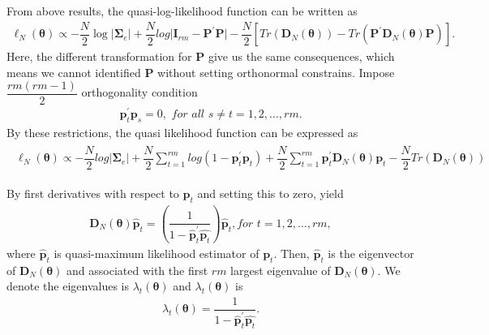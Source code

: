 \documentclass[12pt,a4paper,hyperref]{article}
\begin{document}
From above results, the quasi-log-likelihood function can be written as
\begin{align}
\ell_{N} ( \boldsymbol{\theta}) \propto-\dfrac{N}{2}\log \vert\boldsymbol{\Sigma}_{e} \vert + \dfrac{N}{2} log \vert \boldsymbol{I}_{rm}-\boldsymbol{P}^{'}\boldsymbol{P}\vert-\dfrac{N}{2}\left[Tr\left( \boldsymbol{D}_{N}(\boldsymbol{\theta}) \right)-Tr \left( \boldsymbol{P}^{'}\boldsymbol{D}_{N}(\boldsymbol{\theta})\boldsymbol{P} \right)  \right].
\end{align}
Here, the different transformation for $\boldsymbol{P}$ give us the same consequences, which means we cannot identified $\boldsymbol{P}$ without setting orthonormal constrains.
Impose $\dfrac{rm\left(rm-1\right)}{2}$ orthogonality condition
\begin{align}
\boldsymbol{p}_{t}^{'}\boldsymbol{p}_{s}=0, \,\,for \,\, all \,\,  s \neq t=1,2,\ldots,rm.
\end{align}
By these restrictions, the quasi likelihood function can be expressed as
\begin{align}
\begin{split}
\ell_{N} ( \boldsymbol{\theta}) \propto - \dfrac{N}{2} log \vert \boldsymbol{\Sigma}_{e}  \vert+\dfrac{N}{2} \sum^{rm}_{t=1}log\left( 1-\boldsymbol{p}^{'}_{t}\boldsymbol{p}_{t} \right)
+\dfrac{N}{2} \sum^{rm}_{t=1}\boldsymbol{p}^{'}_{t}\boldsymbol{D}_{N}(\boldsymbol{\theta})\boldsymbol{p}_{t}-\dfrac{N}{2}Tr\left( \boldsymbol{D}_{N}(\boldsymbol{\theta})\right)
\end{split}
\end{align}

By first derivatives with respect to $\boldsymbol{p}_{t}$ and setting this to zero, yield
\begin{align}
\boldsymbol{D}_{N}(\boldsymbol{\theta})\boldsymbol{\hat{\boldsymbol{p}}}_{t}= \left( \dfrac{1}{1-\hat{\boldsymbol{p}}^{'}_{t}\hat{\boldsymbol{p}_{t}}}   \right) \hat{\boldsymbol{p}}_{t}, for\,\, t=1,2,\ldots,rm,
\end{align}
where $\hat{\boldsymbol{p}}_{t}$ is quasi-maximum likelihood estimator of $\boldsymbol{p}_{t}$. Then, $\boldsymbol{\hat{\boldsymbol{p}}}_{t}$ is the eigenvector of $\boldsymbol{D}_{N}(\boldsymbol{\theta})$ and associated with the first $rm$ largest eigenvalue of $\boldsymbol{D}_{N}(\boldsymbol{\theta})$.
We denote the eigenvalues is $\lambda_{t}(\boldsymbol{\theta})$ and $\lambda_{t}(\boldsymbol{\theta})$ is
\begin{align}
\lambda_{t}(\boldsymbol{\theta})= \dfrac{1}{1-\hat{\boldsymbol{p}}^{'}_{t}\hat{\boldsymbol{p}_{t}}} .
\end{align}
\end{document}

